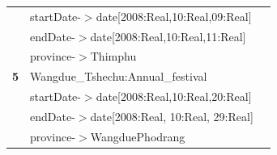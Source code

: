 \documentclass[a4paper,9pt]{beamer}
\begin{document}
{\begin{table} [tbph]
\begin{tabular}{|l|l|l|}
     &startDate-$>$date[2008:Real,10:Real,09:Real]&\\
   &endDate-$>$date[2008:Real,10:Real,11:Real]&\\
   &province-$>$Thimphu&\\
\hline
{\textbf{\color{blue} 5}}  &Wangdue\_Tshechu:Annual\_festival&\\
     &startDate-$>$date[2008:Real,10:Real,20:Real]&\\
   &endDate-$>$date[2008:Real, 10:Real, 29:Real]&\\
   &province-$>$WangduePhodrang&\\
\hline
\end{tabular} 
\end{table} 
}

\end{document}

